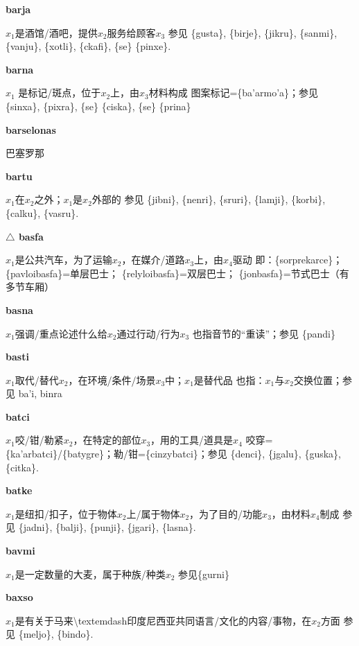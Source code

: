 \documentclass[notitlepage,twocolumn,a4paper,10pt]{book}
\begin{document}
{\sffamily\bfseries barja} $x_1$是酒馆\slash{}酒吧，提供$x_2$服务给顾客$x_3$ \textemdash{} 参见 \{gusta\}, \{birje\}, \{jikru\}, \{sanmi\}, \{vanju\}, \{xotli\}, \{ckafi\}, \{se\} \{pinxe\}.

{\sffamily\bfseries barna}\enspace {\ttfamily\bfseries[        ba'a]}  $x_1$ 是标记\slash{}斑点，位于$x_2$上，由$x_3$材料构成 \textemdash{} 图案标记=\{ba'armo'a\}；参见 \{sinxa\}, \{pixra\}, \{se\} \{ciska\}, \{se\} \{prina\}

{\sffamily\bfseries barselonas} 巴塞罗那

{\sffamily\bfseries bartu}\enspace {\ttfamily\bfseries[bar]}  $x_1$在$x_2$之外；$x_1$是$x_2$外部的 \textemdash{} 参见 \{jibni\}, \{nenri\}, \{sruri\}, \{lamji\}, \{korbi\}, \{calku\}, \{vasru\}.

{\sffamily\bfseries $\triangle$ basfa} $x_1$是公共汽车，为了运输$x_2$，在媒介\slash{}道路$x_3$上，由$x_4$驱动 \textemdash{} 即：\{sorprekarce\}； \{pavloibasfa\}=单层巴士； \{relyloibasfa\}=双层巴士； \{jonbasfa\}=节式巴士（有多节车厢）

{\sffamily\bfseries basna} $x_1$强调\slash{}重点论述什么给$x_2$通过行动\slash{}行为$x_3$ \textemdash{} 也指音节的“重读”；参见 \{pandi\}

{\sffamily\bfseries basti}\enspace {\ttfamily\bfseries[bas]}  $x_1$取代\slash{}替代$x_2$，在环境\slash{}条件\slash{}场景$x_3$中；$x_1$是替代品 \textemdash{} 也指：$x_1$与$x_2$交换位置；参见 {ba'i}, {binra}

{\sffamily\bfseries batci}\enspace {\ttfamily\bfseries[bat]}  $x_1$咬\slash{}钳\slash{}勒紧$x_2$，在特定的部位$x_3$，用的工具\slash{}道具是$x_4$ \textemdash{} 咬穿=\{ka'arbatci\}\slash{}\{batygre\}；勒\slash{}钳=\{cinzybatci\}；参见 \{denci\}, \{jgalu\}, \{guska\}, \{citka\}.

{\sffamily\bfseries batke} $x_1$是纽扣\slash{}扣子，位于物体$x_2$上\slash{}属于物体$x_2$，为了目的\slash{}功能$x_3$，由材料$x_4$制成 \textemdash{} 参见 \{jadni\}, \{balji\}, \{punji\}, \{jgari\}, \{lasna\}.

{\sffamily\bfseries bavmi} $x_1$是一定数量的大麦，属于种族\slash{}种类$x_2$ \textemdash{} 参见\{gurni\}

{\sffamily\bfseries baxso} $x_1$是有关于马来\textbackslash{}textemdash{}印度尼西亚共同语言\slash{}文化的内容\slash{}事物，在$x_2$方面 \textemdash{} 参见 \{meljo\}, \{bindo\}.
\end{document}
